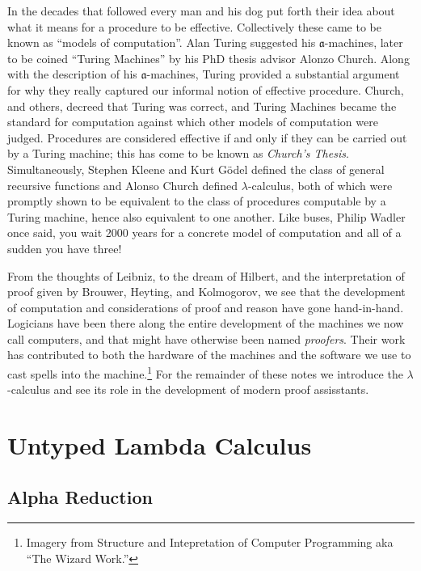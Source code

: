 \documentclass{book}
\begin{document}
    In the decades that followed every man and his dog put forth their idea about what it means for a procedure to be effective. Collectively these came to be known as ``models of computation''. Alan Turing suggested his $\mathfrak{a}$-machines, later to be coined ``Turing Machines'' by his PhD thesis advisor Alonzo Church. Along with the description of his $\mathfrak{a}$-machines, Turing provided a substantial argument for why they really captured our informal notion of effective procedure. Church, and others, decreed that Turing was correct, and Turing Machines became the standard for computation against which other models of computation were judged. Procedures are considered effective if and only if they can be carried out by a Turing machine; this has come to be known as \emph{Church's Thesis}. Simultaneously, Stephen Kleene and Kurt G\"{o}del defined the class of general recursive functions and Alonso Church defined $\lambda$-calculus, both of which were promptly shown to be equivalent to the class of procedures computable by a Turing machine, hence also equivalent to one another. Like buses, Philip Wadler once said, you wait 2000 years for a concrete model of computation and all of a sudden you have three! 



    From the thoughts of Leibniz, to the dream of Hilbert, and the interpretation of proof given by Brouwer, Heyting, and Kolmogorov, we see that the development of computation and considerations of proof and reason have gone hand-in-hand. Logicians have been there along the entire development of the machines we now call computers, and that might have otherwise been named \emph{proofers}. Their work has contributed to both the hardware of the machines and the software we use to cast spells into the machine.\footnote{Imagery from Structure and Intepretation of Computer Programming aka ``The Wizard Work.''} For the remainder of these notes we introduce the $\lambda$-calculus and see its role in the development of modern proof assisstants. 


    \newpage
    \section{Untyped Lambda Calculus}

    \subsection*{Alpha Reduction}
\end{document}
